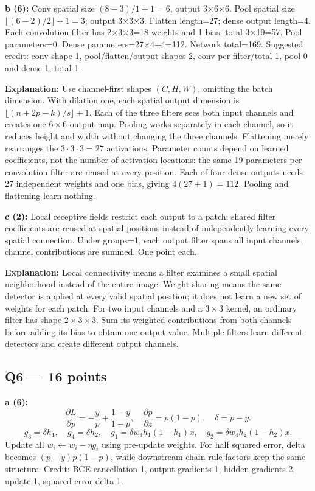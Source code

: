 \documentclass[11pt]{article}
\begin{document}
\textbf{b (6):} Conv spatial size $(8-3)/1+1=6$, output 3\ensuremath{\times}6\ensuremath{\times}6. Pool spatial size $\lfloor(6-2)/2\rfloor+1=3$, output 3\ensuremath{\times}3\ensuremath{\times}3. Flatten length=27; dense output length=4. Each convolution filter has 2\ensuremath{\times}3\ensuremath{\times}3=18 weights and 1 bias; total 3\ensuremath{\times}19=57. Pool parameters=0. Dense parameters=27\ensuremath{\times}4+4=112. Network total=169. Suggested credit: conv shape 1, pool/\allowbreak{}flatten/\allowbreak{}output shapes 2, conv per-filter/\allowbreak{}total 1, pool 0 and dense 1, total 1.

\textbf{Explanation:} Use channel-first shapes $(C,H,W)$, omitting the batch dimension. With dilation one, each spatial output dimension is $\lfloor(n+2p-k)/s\rfloor+1$. Each of the three filters sees both input channels and creates one $6\times6$ output map. Pooling works separately in each channel, so it reduces height and width without changing the three channels. Flattening merely rearranges the $3\cdot3\cdot3=27$ activations. Parameter counts depend on learned coefficients, not the number of activation locations: the same 19 parameters per convolution filter are reused at every position. Each of four dense outputs needs 27 independent weights and one bias, giving $4(27+1)=112$. Pooling and flattening learn nothing.

\textbf{c (2):} Local receptive fields restrict each output to a patch; shared filter coefficients are reused at spatial positions instead of independently learning every spatial connection. Under groups=1, each output filter spans all input channels; channel contributions are summed. One point each.

\textbf{Explanation:} Local connectivity means a filter examines a small spatial neighborhood instead of the entire image. Weight sharing means the same detector is applied at every valid spatial position; it does not learn a new set of weights for each patch. For two input channels and a $3\times3$ kernel, an ordinary filter has shape $2\times3\times3$. Sum its weighted contributions from both channels before adding its bias to obtain one output value. Multiple filters learn different detectors and create different output channels.


\subsection*{Q6 — 16 points}

\textbf{a (6):}
\[
\frac{\partial L}{\partial p}=-\frac y p+\frac{1-y}{1-p},\quad \frac{\partial p}{\partial z}=p(1-p),\quad\delta=p-y.
\]
\[
g_3=\delta h_1,\quad g_4=\delta h_2,\quad
g_1=\delta w_3h_1(1-h_1)x,\quad g_2=\delta w_4h_2(1-h_2)x.
\]
Update all $w_i\leftarrow w_i-\eta g_i$ using pre-update weights. For half squared error, delta becomes $(p-y)p(1-p)$, while downstream chain-rule factors keep the same structure. Credit: BCE cancellation 1, output gradients 1, hidden gradients 2, update 1, squared-error delta 1.
\end{document}
